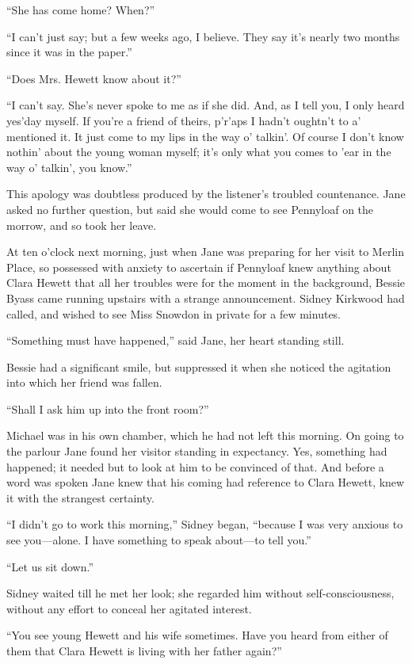 ``She has come home? When?''

``I can't just say; but a few weeks ago, I believe. They say it's nearly
two months since it was in the paper.''

``Does Mrs. Hewett know about it?''

``I can't say. She's never spoke to me as if she did. And, as I tell
you, I only heard yes'day myself. If you're a friend of theirs, p'r'aps
I hadn't oughtn't to a' mentioned it. It just come to my lips in the way
o' talkin'. Of course I don't know nothin' about the young woman myself;
it's only what you comes to 'ear in the way o' talkin', you know.''

This apology was doubtless produced by the listener's troubled
countenance. Jane asked no further question, but said she would come to
see Pennyloaf on the morrow, and so took her leave.

{}At ten o'clock next morning, just when Jane was preparing for her
visit to Merlin Place, so possessed with anxiety to ascertain if
Pennyloaf knew anything about Clara Hewett that all her troubles were
for the moment in the background, Bessie Byass came running upstairs
with a strange announcement. Sidney Kirkwood had called, and wished to
see Miss Snowdon in private for a few minutes.

``Something must have happened,'' said Jane, her heart standing still.

Bessie had a significant smile, but suppressed it when she noticed the
agitation into which her friend was fallen.

``Shall I ask him up into the front room?''

Michael was in his own chamber, which he had not left this morning. On
going to the parlour Jane found her visitor standing in expectancy. Yes,
something had happened; it needed but to look at him to be convinced of
that. And before a word was spoken Jane knew that his coming had
reference to Clara Hewett, knew it with the strangest certainty.

``I didn't go to work this morning,'' Sidney began, ``because I was very
anxious to see {}you---alone. I have something to speak about---to tell
you.''

``Let us sit down.''

Sidney waited till he met her look; she regarded him without
self-consciousness, without any effort to conceal her agitated interest.

``You see young Hewett and his wife sometimes. Have you heard from
either of them that Clara Hewett is living with her father again?''

